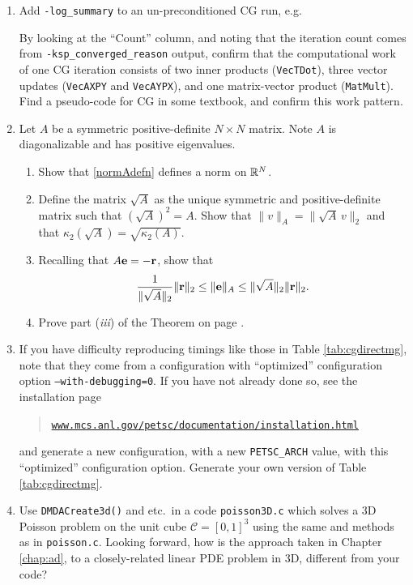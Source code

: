 \begin{enumerate}
\item Add \texttt{-log\_summary} to an un-preconditioned CG run, e.g.
By looking at the ``Count'' column, and noting that the iteration count comes from \texttt{-ksp\_converged\_reason} output, confirm that the computational work of one CG iteration consists of two inner products (\texttt{VecTDot}), three vector updates (\texttt{VecAXPY} and \texttt{VecAYPX}), and one matrix-vector product (\texttt{MatMult}).  Find a pseudo-code for CG in some textbook, and confirm this work pattern.

\item \label{exer:st:Anorm} Let $A$ be a symmetric positive-definite $N\times N$ matrix.  Note $A$ is diagonalizable and has positive eigenvalues.
  \renewcommand{\labelenumii}{(\emph{\roman{enumii}})}
  \begin{enumerate}
  \item Show that \eqref{normAdefn} defines a norm on $\RR^N$.
  \item Define the matrix $$ as the unique symmetric and positive-definite matrix such that $()^2 = A$.  Show that $\|v\|_A = \|\,v\|_2$ and that $\kappa_2\left(\right) = $.
  \item Recalling that $A\be=-\br$, show that
      $$\frac{1}{\|\sqrt{A}\|_2} \|\br\|_2 \le \|\be\|_A \le \|\sqrt{A}\|_2 \|\br\|_2.$$
  \item Prove part (\emph{iii}) of the Theorem on page \pageref{thm:cgiterations}.
  \end{enumerate}

\item If you have difficulty reproducing timings like those in Table \ref{tab:cgdirectmg}, note that they come from a \PETSc configuration with ``optimized'' configuration option \texttt{--with-debugging=0}.  If you have not already done so, see the \PETSc installation page
\begin{quote}
\href{http://www.mcs.anl.gov/petsc/documentation/installation.html}{\texttt{www.mcs.anl.gov/petsc/documentation/installation.html}}
\end{quote}
and generate a new configuration, with a new \texttt{PETSC\_ARCH} value, with this ``optimized'' configuration option.  Generate your own version of Table \ref{tab:cgdirectmg}.

\item Use \texttt{DMDACreate3d()} and etc.~in a code \texttt{poisson3D.c} which solves a 3D Poisson problem on the unit cube $=[0,1]^3$ using the same \pDMDA and \pKSP methods as in \texttt{poisson.c}.  Looking forward, how is the approach taken in Chapter \ref{chap:ad}, to a closely-related linear PDE problem in 3D, different from your code?

\end{enumerate}
